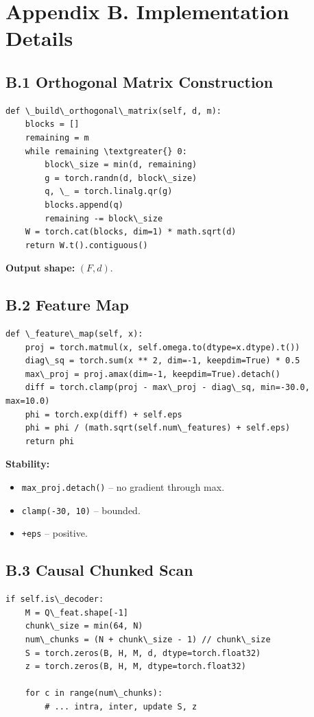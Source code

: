 
\section{Appendix B. Implementation Details}

\subsection{B.1 Orthogonal Matrix Construction}

\begin{lstlisting}
def \_build\_orthogonal\_matrix(self, d, m):
    blocks = []
    remaining = m
    while remaining \textgreater{} 0:
        block\_size = min(d, remaining)
        g = torch.randn(d, block\_size)
        q, \_ = torch.linalg.qr(g)
        blocks.append(q)
        remaining -= block\_size
    W = torch.cat(blocks, dim=1) * math.sqrt(d)
    return W.t().contiguous()
\end{lstlisting}

\textbf{Output shape:} $(F, d)$.

\subsection{B.2 Feature Map}

\begin{lstlisting}
def \_feature\_map(self, x):
    proj = torch.matmul(x, self.omega.to(dtype=x.dtype).t())
    diag\_sq = torch.sum(x ** 2, dim=-1, keepdim=True) * 0.5
    max\_proj = proj.amax(dim=-1, keepdim=True).detach()
    diff = torch.clamp(proj - max\_proj - diag\_sq, min=-30.0, max=10.0)
    phi = torch.exp(diff) + self.eps
    phi = phi / (math.sqrt(self.num\_features) + self.eps)
    return phi
\end{lstlisting}

\textbf{Stability:}
\begin{itemize}
\item \texttt{max\_proj.detach()} -- no gradient through max.
\item \texttt{clamp(-30, 10)} -- bounded.
\item \texttt{+eps} -- positive.

\end{itemize}
\subsection{B.3 Causal Chunked Scan}

\begin{lstlisting}
if self.is\_decoder:
    M = Q\_feat.shape[-1]
    chunk\_size = min(64, N)
    num\_chunks = (N + chunk\_size - 1) // chunk\_size
    S = torch.zeros(B, H, M, d, dtype=torch.float32)
    z = torch.zeros(B, H, M, dtype=torch.float32)
    
    for c in range(num\_chunks):
        # ... intra, inter, update S, z
\end{lstlisting}

